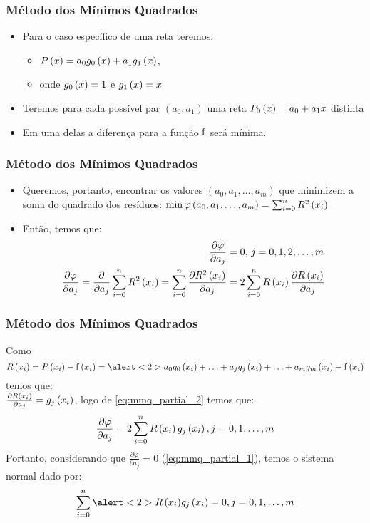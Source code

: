 \begin{frame}
\frametitle{Método dos Mínimos Quadrados}

\begin{itemize}
  \item Para o caso específico de uma reta teremos:
    \begin{itemize}
      \item $P\left(x\right) = a_0 g_0 \left(x\right) + a_1 g_1 \left(x\right)$,
      \item onde $g_0\left(x\right) = 1$ e $g_1\left(x\right) = x$
    \end{itemize}
  \item Teremos para cada possível par $\left(a_0, a_1\right)$ uma reta $P_0 \left(x\right) = a_0 + a_1 x$ distinta
  \item Em uma delas a diferença para a função $\mathrm{f}$ será mínima.
\end{itemize}
\end{frame}

\begin{frame}
\frametitle{Método dos Mínimos Quadrados}

\begin{itemize}
  \item Queremos, portanto, encontrar os valores $\left(a_0, a_1, \ldots, a_m\right)$ que minimizem a soma do quadrado dos resíduos: $\min \varphi\left(a_0,a_1,\ldots,a_m\right) = \sum_{i=0}^{n}R^2\left(x_i\right)$
  \item Então, temos que:
\begin{align}
\frac{\partial \varphi}{\partial a_j} &= 0,\, j = 0,1,2,\ldots,m\label{eq:mmq_partial_1}\\
%
\frac{\partial \varphi}{\partial a_j} = %
\frac{\partial}{\partial a_j} \sum_{i=0}^{n} R^2 \left(\x_i\right) = %
\sum_{i=0}^{n} \frac{\partial R^2 \left(\x_i\right)}{\partial a_j} &= %
2 \sum_{i=0}^{n} R\left(\x_i\right) \frac{\partial R \left(\x_i\right)}{\partial a_j}\label{eq:mmq_partial_2}
\end{align}
%
\end{itemize}
\end{frame}

\begin{frame}
\frametitle{Método dos Mínimos Quadrados}

Como
{
\footnotesize
\begin{equation}
\label{eq:mmq_partial_3}
R\left(x_i\right) = P\left(x_i\right) - \f\left(x_i\right) =%
\alert<2>{a_0 \G_0 \left(\x_i\right) + \ldots + a_j \G_j \left(x_i\right) + \ldots + a_m \G_m \left(x_i\right) - \f \left(\x_i\right)}
\end{equation}}%
temos que:\\
$\frac{\partial R \left(x_i\right)}{\partial a_j} = g_j \left(x_i\right)$, logo de \cref{eq:mmq_partial_2} temos que:
\[
\frac{\partial \varphi}{\partial a_j} = 2 \sum_{i=0}^{n} R\left(x_i\right) g_j \left(x_i\right), j = 0,1,\ldots,m
\]
Portanto, considerando que $\frac{\partial \varphi}{\partial a_j} = 0$ (\cref{eq:mmq_partial_1}), temos o sistema normal dado por:
\[
\sum_{i=0}^{n} \alert<2>{R\left(\x_i\right)} \G_j \left(\x_i\right) = 0, j = 0, 1, \ldots, m
\]
\end{frame}


